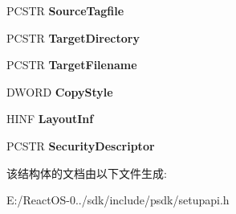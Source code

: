 \begin{DoxyCompactItemize}
\mbox{\label{struct___s_p___f_i_l_e___c_o_p_y___p_a_r_a_m_s___a_a637462097530a28c443207ccd841599d}} 
P\+C\+S\+TR {\bfseries Source\+Tagfile}
\item 
\mbox{\label{struct___s_p___f_i_l_e___c_o_p_y___p_a_r_a_m_s___a_ad790bb63c2910b0b3218b337115921e6}} 
P\+C\+S\+TR {\bfseries Target\+Directory}
\item 
\mbox{\label{struct___s_p___f_i_l_e___c_o_p_y___p_a_r_a_m_s___a_a656259c2372018a6a6efcec028dd5409}} 
P\+C\+S\+TR {\bfseries Target\+Filename}
\item 
\mbox{\label{struct___s_p___f_i_l_e___c_o_p_y___p_a_r_a_m_s___a_a4a4be102e4fe325307a018d553cc76fd}} 
D\+W\+O\+RD {\bfseries Copy\+Style}
\item 
\mbox{\label{struct___s_p___f_i_l_e___c_o_p_y___p_a_r_a_m_s___a_afd5b96eabbfc2bf76e2614128a9f88e4}} 
H\+I\+NF {\bfseries Layout\+Inf}
\item 
\mbox{\label{struct___s_p___f_i_l_e___c_o_p_y___p_a_r_a_m_s___a_a069a5f589fe5e90be217b961f846db3d}} 
P\+C\+S\+TR {\bfseries Security\+Descriptor}
\end{DoxyCompactItemize}


该结构体的文档由以下文件生成\+:\begin{DoxyCompactItemize}
\item 
E\+:/\+React\+O\+S-\/0../sdk/include/psdk/setupapi.\+h\end{DoxyCompactItemize}
